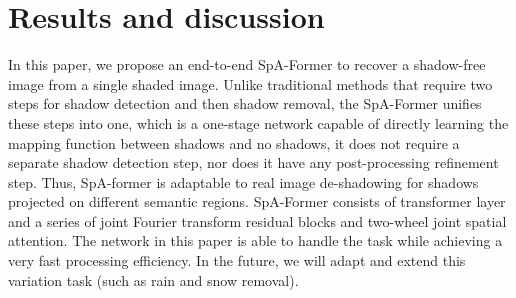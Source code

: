 \documentclass[journal]{IEEEtran}
\begin{document}
\section{Results and discussion}
In this paper, we propose an end-to-end SpA-Former to recover a shadow-free image from a single shaded image. Unlike traditional methods that require two steps for shadow detection and then shadow removal, the SpA-Former unifies these steps into one, which is a one-stage network capable of directly learning the mapping function between shadows and no shadows, it does not require a separate shadow detection step, nor does it have any post-processing refinement step. Thus, SpA-former is adaptable to real image de-shadowing for shadows projected on different semantic regions. SpA-Former consists of transformer layer and a series of joint Fourier transform residual blocks and two-wheel joint spatial attention. The network in this paper is able to handle the task while achieving a very fast processing efficiency. In the future, we will adapt and extend this variation task (such as rain and snow removal).
\end{document}
